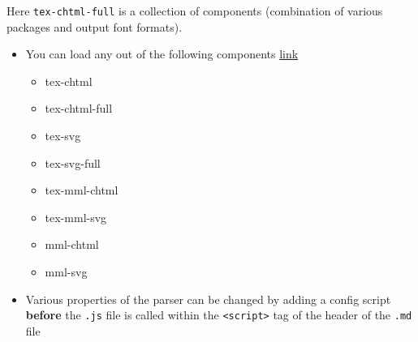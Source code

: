 \documentclass[
]{article}
\newenvironment{Shaded}{}{}
\newcommand{\AttributeTok}[1]{\textcolor[rgb]{0.49,0.56,0.16}{#1}}
\newcommand{\FunctionTok}[1]{\textcolor[rgb]{0.02,0.16,0.49}{#1}}
\newcommand{\KeywordTok}[1]{\textcolor[rgb]{0.00,0.44,0.13}{\textbf{#1}}}
\newcommand{\StringTok}[1]{\textcolor[rgb]{0.25,0.44,0.63}{#1}}
\providecommand{\tightlist}{%
  \setlength{\itemsep}{0pt}\setlength{\parskip}{0pt}}
\begin{document}
Here \texttt{tex-chtml-full} is a collection of components (combination
of various packages and output font formats).

\begin{itemize}
\tightlist
\item
  You can load any out of the following components
  \href{https://docs.mathjax.org/en/latest/web/components/index.html}{link}

  \begin{itemize}
  \tightlist
  \item
    tex-chtml
  \item
    tex-chtml-full
  \item
    tex-svg
  \item
    tex-svg-full
  \item
    tex-mml-chtml
  \item
    tex-mml-svg
  \item
    mml-chtml
  \item
    mml-svg
  \end{itemize}
\item
  Various properties of the parser can be changed by adding a config
  script \textbf{before} the \texttt{.js} file is called within the
  \texttt{\textless{}script\textgreater{}} tag of the header of the
  \texttt{.md} file
\end{itemize}

\begin{Shaded}
\end{Shaded}
\end{document}
